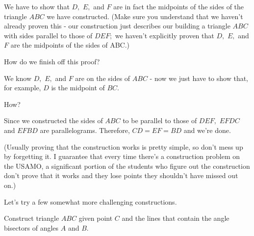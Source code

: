 We have to show that $D,$ $E,$ and $F$ are in fact the midpoints of the sides of the triangle $ABC$ we have constructed. (Make sure you understand that we haven't already proven this - our construction just describes our building a triangle $ABC$ with sides parallel to those of $DEF;$ we haven't explicitly proven that $D,$ $E,$ and $F$ are the midpoints of the sides of ABC.)

How do we finish off this proof?


We know $D,$ $E,$ and $F$ are on the sides of $ABC$ - now we just have to show that, for example, $D$ is the midpoint of $BC.$

How?



Since we constructed the sides of $ABC$ to be parallel to those of $DEF,$ $EFDC$ and $EFBD$ are parallelograms. Therefore, $CD = EF = BD$ and we're done.

(Usually proving that the construction works is pretty simple, so don't mess up by forgetting it. I guarantee that every time there's a construction problem on the USAMO, a significant portion of the students who figure out the construction don't prove that it works and they lose points they shouldn't have missed out on.)

\vspace{10pt}
Let's try a few somewhat more challenging constructions.

\begin{example}
    Construct triangle $ABC$ given point $C$ and the lines that contain the angle bisectors of angles $A$ and $B$.    
\end{example}




